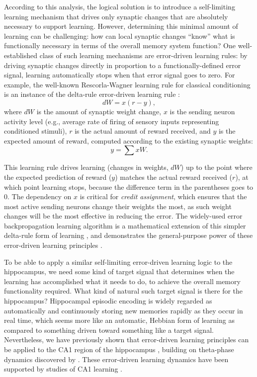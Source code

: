 \documentclass[11pt,twoside]{article}
\newif\myifpdf
\begin{document}
According to this analysis, the logical solution is to introduce a self-limiting learning mechanism that drives only synaptic changes that are absolutely necessary to support learning.  However, determining this minimal amount of learning can be challenging: how can local synaptic changes ``know'' what is functionally necessary in terms of the overall memory system function?  One well-established class of such learning mechanisms are error-driven learning rules: by driving synaptic changes directly in proportion to a functionally-defined error signal, learning automatically stops when that error signal goes to zero. For example, the well-known Rescorla-Wagner learning rule for classical conditioning \citep{RescorlaWagner72} is an instance of the delta-rule error-driven learning rule \citep{WidrowHoff60}:
\begin{equation}
	dW = x (r - y),
\end{equation}
where $dW$ is the amount of synaptic weight change, $x$ is the sending neuron activity level (e.g., average rate of firing of sensory inputs representing conditioned stimuli), $r$ is the actual amount of reward received, and $y$ is the expected amount of reward, computed according to the existing synaptic weights:
\begin{equation}
	y = \sum x W.
\end{equation}

This learning rule drives learning (changes in weights, $dW$) up to the point where the expected prediction of reward ($y$) matches the actual reward received ($r$), at which point learning stops, because the difference term in the parentheses goes to 0. The dependency on $x$ is critical for \emph{credit assignment}, which ensures that the most active sending neurons change their weights the most, as such weight changes will be the most effective in reducing the error.  The widely-used error backpropagation learning algorithm is a mathematical extension of this simpler delta-rule form of learning \citep{RumelhartHintonWilliams86}, and demonstrates the general-purpose power of these error-driven learning principles \citep{LeCunBengioHinton15}.

To be able to apply a similar self-limiting error-driven learning logic to the hippocampus, we need some kind of target signal that determines when the learning has accomplished what it needs to do, to achieve the overall memory functionality required.  What kind of natural such target signal is there for the hippocampus?  Hippocampal episodic encoding is widely regarded as automatically and continuously storing new memories rapidly as they occur in real time, which seems more like an automatic, Hebbian form of learning as compared to something driven toward something like a target signal.  Nevertheless, we have previously shown that error-driven learning principles can be applied to the CA1 region of the hippocampus \citep{KetzMorkondaOReilly13}, building on theta-phase dynamics discovered by \citep{HasselmoBodelonWyble02}.  These error-driven learning dynamics have been supported by studies of CA1 learning \citet{SchapiroTurk-BrowneNormanEtAl16,SchapiroTurk-BrowneBotvinickEtAl17}.
\end{document}
